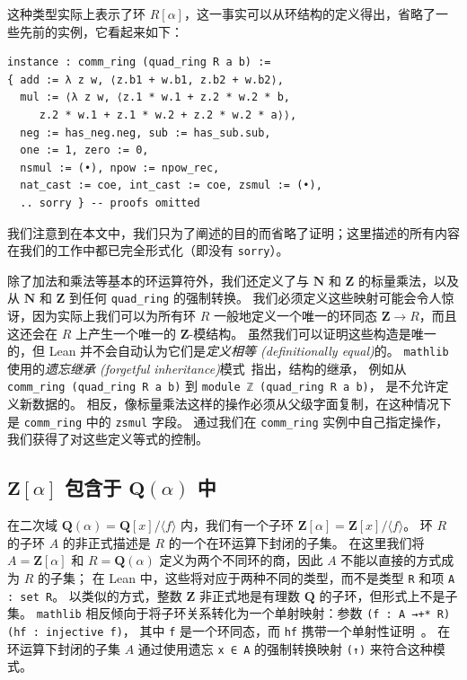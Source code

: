 \documentclass[sigplan,10pt,nonacm,
screen]{acmart} \settopmatter{printfolios=true,printccs=false,printacmref=false}
\newcommand{\mathlib}{\lstinline{mathlib}\xspace}
\newcommand{\QQ}{\mathbf{Q}}
\newcommand{\ZZ}{\mathbf{Z}}
\newcommand{\NN}{\mathbf{N}}
\begin{document}
    这种类型实际上表示了环 $R[\alpha]$，这一事实可以从环结构的定义得出，省略了一些先前的实例，它看起来如下：
\begin{lstlisting}
instance : comm_ring (quad_ring R a b) :=
{ add := λ z w, ⟨z.b1 + w.b1, z.b2 + w.b2⟩,
  mul := ⟨λ z w, ⟨z.1 * w.1 + z.2 * w.2 * b,
     z.2 * w.1 + z.1 * w.2 + z.2 * w.2 * a⟩⟩,
  neg := has_neg.neg, sub := has_sub.sub,
  one := 1, zero := 0,
  nsmul := (•), npow := npow_rec,
  nat_cast := coe, int_cast := coe, zsmul := (•),
  .. sorry } -- proofs omitted
\end{lstlisting}

我们注意到在本文中，我们只为了阐述的目的而省略了证明；这里描述的所有内容在我们的工作中都已完全形式化（即没有 \lstinline{sorry}）。

    除了加法和乘法等基本的环运算符外，我们还定义了与 $\NN$ 和 $\ZZ$ 的标量乘法，以及从 $\NN$ 和 $\ZZ$ 到任何 \lstinline{quad_ring} 的强制转换。
    我们必须定义这些映射可能会令人惊讶，因为实际上我们可以为所有环 $R$ 一般地定义一个唯一的环同态 $\ZZ \to R$，而且这还会在 $R$ 上产生一个唯一的 $\ZZ$-模结构。
    虽然我们可以证明这些构造是唯一的，但 Lean 并不会自动认为它们是\emph{定义相等 (definitionally equal)}的。
    \mathlib 使用的\emph{遗忘继承 (forgetful inheritance)}模式~\cite{Forgetful-inheritance,typeclasses}指出，结构的继承，
    例如从 \lstinline{comm_ring (quad_ring R a b)} 到 \lstinline{module ℤ (quad_ring R a b)}，
    是不允许定义新数据的。
    相反，像标量乘法这样的操作必须从父级字面复制，在这种情况下是 \lstinline{comm_ring} 中的 \lstinline{zsmul} 字段。
    通过我们在 \lstinline{comm_ring} 实例中自己指定操作，我们获得了对这些定义等式的控制。

    \subsection{$\ZZ[\alpha]$ 包含于 $\QQ(\alpha)$ 中} \label{sec:quad_ring_algebra}

在二次域 $\QQ(\alpha) = \QQ[x] / \langle f\rangle$ 内，我们有一个子环 $\ZZ[\alpha] = \ZZ[x] / \langle f\rangle$。
环 $R$ 的子环 $A$ 的非正式描述是 $R$ 的一个在环运算下封闭的子集。
在这里我们将 $A = \ZZ[\alpha]$ 和 $R = \QQ(\alpha)$ 定义为两个不同环的商，因此 $A$ 不能以直接的方式成为 $R$ 的子集；
在 Lean 中，这些将对应于两种不同的类型，而不是类型 \lstinline{R} 和项 \lstinline{A : set R}。
以类似的方式，整数 $\ZZ$ 非正式地是有理数 $\QQ$ 的子环，但形式上不是子集。
\mathlib 相反倾向于将子环关系转化为一个单射映射：参数 \lstinline{(f : A →+* R) (hf : injective f)}，
其中 \lstinline{f} 是一个环同态，而 \lstinline{hf} 携带一个单射性证明~\cite{baanen_formalization_2021}。
在环运算下封闭的子集 $A$ 通过使用遗忘 \lstinline{x ∈ A} 的强制转换映射 \lstinline{(↑)} 来符合这种模式。
\end{document}
